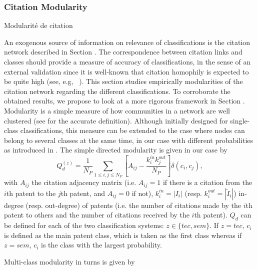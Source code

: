 \subsubsection*{Citation Modularity}{Modularité de citation}
\label{app:subsubsec:citationmodularity}

An exogenous source of information on relevance of classifications is the citation network described in Section . The correspondence between citation links and classes should provide a measure of accuracy of classifications, in the sense of an external validation since it is well-known that citation homophily  is expected to be quite high (see, e.g, ~\cite{AAKnetwork2016}). This section studies empirically modularities of the citation network regarding the different classifications. To corroborate the obtained results, we propose to look at a more rigorous framework in Section . Modularity is a simple measure of how communities in a network are well clustered (see \cite{clauset2004finding} for the accurate definition). Although initially designed for single-class classifications, this measure can be extended to the case where nodes can belong to several classes at the same time, in our case with different probabilities as introduced in \cite{nicosia2009extending}. The simple directed modularity is given in our case by
\[
Q_d^{(z)} = \displaystyle \frac{1}{N_P}\sum_{1\leq i,j\leq N_P}\left[A_{ij} - \frac{k_{i}^{in}k_{j}^{out}}{N_P}\right]\delta(c_i,c_j),
\]
with $A_{ij}$ the citation adjacency matrix (i.e. $A_{ij} = 1$ if there is a citation from the $i$th patent to the $j$th patent, and $A_{ij}=0$ if not), $k_i^{in}=\left| I_i\right|$ (resp. $k_i^{out}= \left|\tilde{I}_i \right|$) in-degree (resp. out-degree) of patents (i.e. the number of citations made by the $i$th patent to others and the number of citations received by the $i$th patent). $Q_d$ can be defined for each of the two classification systems: $z \in \{tec, sem\}$. If $z=tec$, $c_i$ is defined as the main patent class, which is taken as the first class whereas if $z=sem$, $c_i$ is the class with the largest probability.

Multi-class modularity in turns is given by

